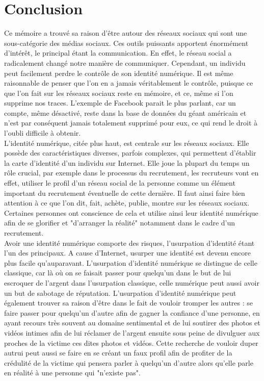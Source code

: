 \documentclass[12pt]{report}
\begin{document}
\chapter{Conclusion}
Ce mémoire a trouvé sa raison d'être autour des réseaux sociaux qui sont une sous-catégorie des médias sociaux. Ces outils puissants apportent énormément d'intérêt, le principal étant la communication. En effet, le réseau social a radicalement changé notre manière de communiquer. Cependant, un individu peut facilement perdre le contrôle de son identité numérique. Il est même raisonnable de penser que l'on en a jamais véritablement le contrôle, puisque ce que l'on fait sur les réseaux sociaux reste en mémoire, et ce, même si l'on supprime nos traces. L'exemple de Facebook parait le plus parlant, car un compte, même désactivé, reste dans la base de données du géant américain et n'est par conséquent jamais totalement supprimé pour eux, ce qui rend le droit à l'oubli difficile à obtenir. \\

L'identité numérique, citée plus haut, est centrale sur les réseaux sociaux. Elle possède des caractéristiques diverses, parfois complexes, qui permettent d'établir la carte d'identité d'un individu sur Internet. Elle joue la plupart du temps un rôle crucial, par exemple dans le processus du recrutement, les recruteurs vont en effet, utiliser le profil d'un réseau social de la personne comme un élément important du recrutement éventuelle de cette dernière. Il faut ainsi faire bien attention à ce que l'on dit, fait, achète, publie, montre sur les réseaux sociaux. Certaines personnes ont conscience de cela et utilise ainsi leur identité numérique afin de se glorifier et "d'arranger la réalité" notamment dans le cadre d'un recrutement.\\

Avoir une identité numérique comporte des risques, l'usurpation d'identité étant l'un des principaux. A cause d'Internet, usurper une identité est devenu encore plus facile qu'auparavant. L'usurpation d'identité numérique se distingue de celle classique, car là où on se faisait passer pour quelqu'un dans le but de lui escroquer de l'argent dans l'usurpation classique, celle numérique peut aussi avoir un but de sabotage de réputation. L'usurpation d'identité numérique peut également trouver sa raison d'être dans le fait de vouloir tromper les autres : se faire passer pour quelqu'un d'autre afin de gagner la confiance d'une personne, en ayant recours très souvent au domaine sentimental et de lui soutirer des photos et vidéos intimes afin de lui réclamer de l'argent ensuite sous peine de divulguer aux proches de la victime ces dites photos et vidéos. Cette recherche de vouloir duper autrui peut aussi se faire en se créant un faux profil afin de profiter de la crédulité de la victime qui pensera parler à quelqu'un d'autre alors qu'elle parle en réalité à une personne qui "n'existe pas".\\
\end{document}
